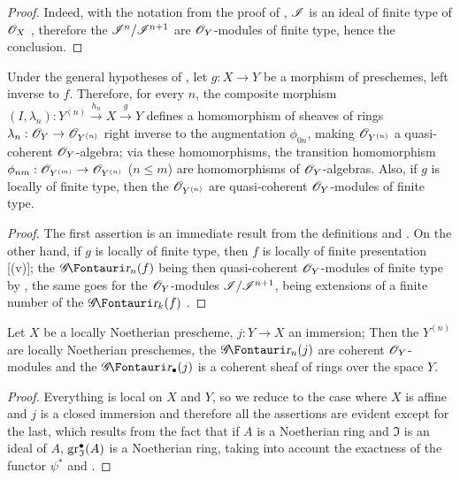 \begin{proof}
Indeed, with the notation from the proof of , $\mathscr{I}$ is an ideal of finite type of $\mathscr{O}_X$ , therefore the $\mathscr{I}^n/\mathscr{I}^{n+1}$ are $\mathscr{O}_Y$-modules of finite type, hence the conclusion.
\end{proof}

\begin{corollary}[16.1.7]
\label{IV.16.1.7}
Under the general hypotheses of , let $g:X \to Y$ be a morphism of preschemes, left inverse to $f$.
Therefore, for every $n$, the composite morphism $(I, \lambda_n): Y^{(n)}\xrightarrow{h_n} X \xrightarrow{g} Y$ defines a homomorphism of sheaves of rings $\lambda_n: \sh{O}_Y \to \sh{O}_{Y^{(n)}}$ right inverse to the augmentation $\phi_{0n}$, making $\mathscr{O}_{Y^{(n)}}$ a quasi-coherent $\mathscr{O}_Y$-algebra;
via these homomorphisms, the transition homomorphism $\phi_{nm}:\sh{O}_{Y^{(m)}} \to \sh{O}_{Y^{(n)}}$ ($n\leq m$) are homomorphisms of $\mathscr{O}_Y$-algebras. 
Also, if $g$ is locally of finite type, then the $\mathscr{O}_{Y^{(n)}}$ are quasi-coherent $\mathscr{O}_Y$-modules of finite type.
\end{corollary}

\begin{proof}
The first assertion is an immediate result from the definitions and .
On the other hand, if $g$ is locally of finite type, then $f$ is locally of finite presentation [(v)];
the $\shGr_n(f)$ being then quasi-coherent $\mathscr{O}_Y$-modules of finite type by , the same goes for the $\mathscr{O}_Y$-modules $\mathscr{I}/\mathscr{I}^{n+1}$, being extensions of a finite number of the $\shGr_k(f)$ .
\end{proof}

\begin{proposition}[16.1.8]
\label{IV.16.1.8}
Let $X$ be a locally Noetherian prescheme, $j:Y \to X$ an immersion;
Then the $Y^{(n)}$ are locally Noetherian preschemes, the $\shGr_n(j)$ are coherent $\mathscr{O}_Y$-modules and the $\shGr_\bullet(j)$ is a coherent sheaf of rings over the space $Y$.
\end{proposition}

\begin{proof}
Everything is local on $X$ and $Y$, so we reduce to the case where $X$ is affine and $j$ is a closed immersion and therefore all the assertions are evident except for the last, which results from the fact that if $A$ is a Noetherian ring and $\mathfrak{I}$ is an ideal of $A$, $\operatorname{gr}_\mathfrak{I}^\bullet(A)$ is a Noetherian ring, taking into account the exactness of the functor $\psi^*$ and .
\end{proof}

